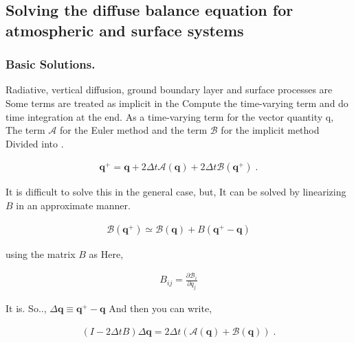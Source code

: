 \hypertarget{solving-the-diffuse-balance-equation-for-atmospheric-and-surface-systems}{%
\subsection{Solving the diffuse balance equation for atmospheric and
surface
systems}\label{solving-the-diffuse-balance-equation-for-atmospheric-and-surface-systems}}

\hypertarget{basic-solutions.}{%
\subsubsection{Basic Solutions.}\label{basic-solutions.}}

Radiative, vertical diffusion, ground boundary layer and surface
processes are Some terms are treated as implicit in the Compute the
time-varying term and do time integration at the end. As a time-varying
term for the vector quantity {q}, The term \({\mathcal A}\) for the
Euler method and the term \({\mathcal B}\) for the implicit method
Divided into .

\begin{eqnarray}
  {\mathbf q}^+
      = {\mathbf q} + 2 \Delta t {\mathcal A}( {\mathbf q}   )
                           + 2 \Delta t {\mathcal B}( {\mathbf q}^+ ) \; .
\end{eqnarray}

It is difficult to solve this in the general case, but, It can be solved
by linearizing \(B\) in an approximate manner.

\begin{eqnarray}
  {\mathcal B}( {\mathbf q}^+ )
                           \simeq {\mathcal B}( {\mathbf q} )
                            + B( {\mathbf q}^+ - {\mathbf q} )
\end{eqnarray}

using the matrix \(B\) as Here,

\begin{eqnarray}
  B_{ij} = \frac{\partial {\mathcal B}_i}{\partial q_j}
\end{eqnarray}

It is. So.., \(\Delta {\mathbf q} \equiv {\mathbf q}^+ - {\mathbf q}\)
And then you can write,

\begin{eqnarray}
  ( I - 2 \Delta t B ) \Delta {\mathbf q}
      = 2 \Delta t \left(  {\mathcal A}( {\mathbf q} )
                         + {\mathcal B}( {\mathbf q} ) \right) \; .
\end{eqnarray}

